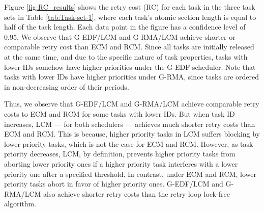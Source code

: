 \documentclass[letter]{sig-alternate}
\begin{document}
Figure \ref{fig:RC_results} shows the retry cost (RC) 
for each task in the three task sets in Table \ref{tab:Task-set-1}, where each task's atomic section length is equal to half of the task length. Each data point in the figure has a confidence level of 0.95. We observe that G-EDF/LCM and G-RMA/LCM achieve shorter
or comparable retry cost than ECM and RCM. Since all tasks are initially
released at the same time, and due to the specific nature of task properties, tasks with lower IDs somehow have higher priorities under the G-EDF scheduler. Note that tasks with lower IDs have higher priorities under G-RMA, since tasks are ordered in non-decreasing order of their periods. 

Thus, we observe that G-EDF/LCM and G-RMA/LCM achieve comparable retry costs
to ECM and RCM for some tasks with lower IDs. But when task ID increases,
LCM --- for both schedulers --- achieves much shorter retry costs 
than ECM and RCM. 
This is because, higher priority tasks in LCM suffers blocking
by lower priority tasks, which is not the case for ECM and RCM. However, as task priority decreases, LCM, by definition, prevents higher priority
tasks from aborting lower priority ones if a higher priority task
interferes with a lower priority one after a specified threshold. In contrast, under ECM and RCM, lower priority tasks abort in favor of higher priority ones. G-EDF/LCM and G-RMA/LCM also achieve shorter retry costs than the retry-loop lock-free algorithm.
\end{document}
